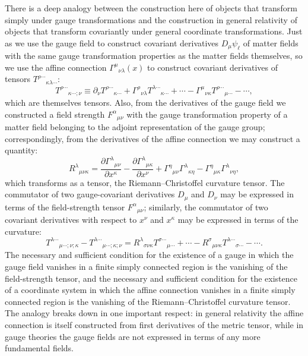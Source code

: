 There is a deep analogy between the construction here of objects that transform
simply under gauge transformations and the construction in general relativity of
objects that transform covariantly under general coordinate transformations. Just
as we use the gauge field to construct covariant derivatives $D_\mu\psi_\ell$ of
matter fields with the same gauge transformation properties as the matter fields
themselves, so we use the affine connection $\Gamma^\mu{}_{\nu\lambda}(x)$ to
construct covariant derivatives of tensors $T^{\rho\cdots}{}_{\kappa\lambda\cdots}$:
\[
 T^{\rho\cdots}{}_{\kappa\cdots;\nu}
 \equiv\partial_\nu T^{\rho\cdots}{}_{\kappa\cdots}
 +\Gamma^\rho{}_{\nu\lambda}T^{\lambda\cdots}{}_{\kappa\cdots}+\cdots
 -\Gamma^\mu{}_{\nu\kappa}T^{\rho\cdots}{}_{\mu\cdots}-\cdots ,
\]
which are themselves tensors. Also, from the derivatives of the gauge field we
constructed a field strength $F^\alpha{}_{\mu\nu}$ with the gauge transformation
property of a matter field belonging to the adjoint representation of the gauge
group; correspondingly, from the derivatives of the affine connection we may
construct a quantity:
\[
 R^\lambda{}_{\mu\nu\kappa}
 =\frac{\partial\Gamma^\lambda{}_{\mu\nu}}{\partial x^\kappa}
 -\frac{\partial\Gamma^\lambda{}_{\mu\kappa}}{\partial x^\nu}
 +\Gamma^\eta{}_{\mu\nu}\Gamma^\lambda{}_{\kappa\eta}
 -\Gamma^\eta{}_{\mu\kappa}\Gamma^\lambda{}_{\nu\eta} ,
\]
which transforms as a tensor, the Riemann--Christoffel curvature tensor. The
commutator of two gauge-covariant derivatives $D_\mu$ and $D_\nu$ may be
expressed in terms of the field-strength tensor $F^\alpha{}_{\mu\nu}$; similarly,
the commutator of two covariant derivatives with respect to $x^\nu$ and $x^\kappa$
may be expressed in terms of the curvature:
\[
 T^{\lambda\cdots}{}_{\mu\cdots;\nu;\kappa}
 -T^{\lambda\cdots}{}_{\mu\cdots;\kappa;\nu}
 =R^\lambda{}_{\sigma\nu\kappa}T^{\sigma\cdots}{}_{\mu\cdots}+\cdots
 -R^\sigma{}_{\mu\nu\kappa}T^{\lambda\cdots}{}_{\sigma\cdots}-\cdots .
\]
The necessary and sufficient condition for the existence of a gauge in which the
gauge field vanishes in a finite simply connected region is the vanishing of the
field-strength tensor, and the necessary and sufficient condition for the
existence of a coordinate system in which the affine connection vanishes in a
finite simply connected region is the vanishing of the Riemann--Christoffel
curvature tensor. The analogy breaks down in one important respect: in general
relativity the affine connection is itself constructed from first derivatives of
the metric tensor, while in gauge theories the gauge fields are not expressed in
terms of any more fundamental fields.
